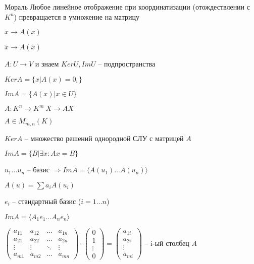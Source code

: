\documentclass[12pt]{article}
\newcommand{\q}[1]{\langle #1 \rangle}
\begin{document}
\begin{Remark}{Мораль}
    Любое линейное отображение при координатизации (отождествлении с $K^n$) превращается в умножение на матрицу

    $x \rightarrow A(x)$

    $\tilde{x} \rightarrow A(\tilde{x})$
\end{Remark}

$A : U \rightarrow V$ и знаем $KerU, ImU$ -- подпространства

$KerA = \{ x | A(x) = 0_v \}$

$ImA = \{ A(x) | x \in U \}$

$A : K^n \rightarrow K^m\ X \rightarrow AX$

$A \in M_{m, n}(K)$

$KerA$ -- множество решений однородной СЛУ с матрицей $A$

$ImA = \{ B | \exists x : Ax = B \}$

$u_1 \ldots u_n$ -- базис $\Rightarrow ImA = \q{A(u_1) \ldots A(u_n)}$

$A(u) = \sum a_iA(u_i)$

$e_i$ -- стандартный базис ($i = 1 \ldots n$)

$ImA = \q{A_1e_1 \ldots A_ne_n}$

$\begin{pmatrix}
    a_{11} & a_{12} & \ldots & a_{1n} \\
    a_{21} & a_{22} & \ldots & a_{2n} \\
    \vdots & \vdots & \ddots & \vdots \\
    a_{m1} & a_{m2} & \ldots & a_{mn}
\end{pmatrix} \cdot \begin{pmatrix}
    0 \\
    1 \\
    \vdots \\
    0
\end{pmatrix} = \begin{pmatrix}
    a_{1i} \\
    a_{2i} \\
    \vdots \\
    a_{mi}
\end{pmatrix}$ -- i-ый столбец $A$
\end{document}
